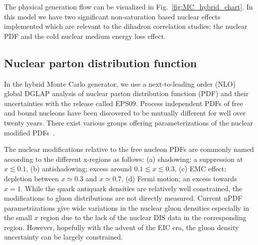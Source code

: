 The physical generation flow can be visualized in Fig.~\ref{fig:MC_hybrid_chart}.
In this model we have two significant non-saturation based nuclear effects implemented which are relevant to the dihadron correlation studies: the nuclear PDF and the cold nuclear medium energy loss effect.

\subsection{Nuclear parton distribution function}
In the hybrid Monte Carlo generator, we use a next-to-leading order (NLO) global
DGLAP analysis of nuclear parton distribution function (PDF) and their uncertainties with the release called
EPS09. Process independent PDFs of free and bound nucleons
have been discovered to be mutually different for well over twenty years. There
exist various groups offering parameterizations of the nuclear modified PDFs~\cite{Hirai:2004wq,deFlorian:2003qf}.


The nuclear modifications relative to the free nucleon PDFs are commonly named
according to the different x-regions as follows: (a) shadowing; a suppression at
$x\lesssim 0.1$, (b) antishadowing; excess around $0.1\lesssim x \lesssim 0.3$,
(c) EMC effect; depletion between $x\simeq 0.3$ and $x \simeq 0.7$, (d) Fermi
motion; an excess towards $x=1$. While the quark antiquark densities are
relatively well constrained, the modifications to gluon distributions are not
directly measured. Current nPDF parametrizations give wide variations in the
nuclear gluon densities especially in the small $x$ region due to the lack of the
nuclear DIS data in the corresponding region. However, hopefully with the advent
of the EIC era, the gluon density uncertainty can be largely constrained.

